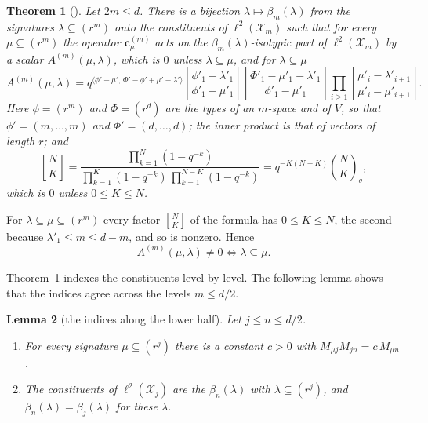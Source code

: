 \documentclass[11pt]{article}
\numberwithin{equation}{section}
\theoremstyle{plain}
\newtheorem{theorem}{Theorem}[section]
\newtheorem{lemma}[theorem]{Lemma}
\theoremstyle{definition}
\begin{document}
\begin{theorem}[{\cite[Thm. 2, Cor. 3, Thm. 4, Cor. 6]{BO12}}]\label{thm:6.2}
Let $2m\le d$. There is a bijection $\lambda\mapsto\beta_m(\lambda)$ from the signatures
$\lambda\subseteq(r^m)$ onto the constituents of $\ell^2(\mathcal{X}_m)$ such that for every
$\mu\subseteq(r^m)$ the operator $\mathbf c^{(m)}_\mu$ acts on the
$\beta_m(\lambda)$-isotypic part of $\ell^2(\mathcal{X}_m)$ by a scalar
$A^{(m)}(\mu,\lambda)$, which is $0$ unless $\lambda\subseteq\mu$, and for
$\lambda\subseteq\mu$
\[
A^{(m)}(\mu,\lambda)=q^{\langle\phi'-\mu',\,\Phi'-\phi'+\mu'-\lambda'\rangle}
\genfrac{[}{]}{0pt}{}{\phi'_1-\lambda'_1}{\phi'_1-\mu'_1}
\genfrac{[}{]}{0pt}{}{\Phi'_1-\mu'_1-\lambda'_1}{\phi'_1-\mu'_1}
\prod_{i\ge1}\genfrac{[}{]}{0pt}{}{\mu'_i-\lambda'_{i+1}}{\mu'_i-\mu'_{i+1}}.
\]
Here $\phi=(r^m)$ and $\Phi=(r^d)$ are the types of an $m$-space and of $V$, so that
$\phi'=(m,\dots,m)$ and $\Phi'=(d,\dots,d)$; the inner product is that of vectors of length
$r$; and
\[
\genfrac{[}{]}{0pt}{}{N}{K}=\frac{\prod_{k=1}^{N}(1-q^{-k})}
{\prod_{k=1}^{K}(1-q^{-k})\,\prod_{k=1}^{N-K}(1-q^{-k})}=q^{-K(N-K)}\binom NK_q,
\]
which is $0$ unless $0\le K\le N$.
\end{theorem}

For $\lambda\subseteq\mu\subseteq(r^m)$ every factor $\genfrac{[}{]}{0pt}{}{N}{K}$ of the formula has
$0\le K\le N$, the second because $\lambda'_1\le m\le d-m$, and so is nonzero. Hence
\begin{equation}\label{eq:6.2}
A^{(m)}(\mu,\lambda)\ne0\iff\lambda\subseteq\mu .
\end{equation}

Theorem~\ref{thm:6.2} indexes the constituents level by level. The following lemma
shows that the indices agree across the levels $m\le d/2$.

\begin{lemma}[the indices along the lower half]\label{thm:6.3}
Let $j\le n\le d/2$.
\begin{enumerate}
\item For every signature $\mu\subseteq(r^j)$ there is a constant $c>0$ with
  $M_{\mu j} M_{jn}=c\,M_{\mu n}$.
\item The constituents of $\ell^2(\mathcal{X}_j)$ are the $\beta_n(\lambda)$ with
  $\lambda\subseteq(r^j)$, and $\beta_n(\lambda)=\beta_j(\lambda)$ for these $\lambda$.
\end{enumerate}
\end{lemma}
\end{document}
